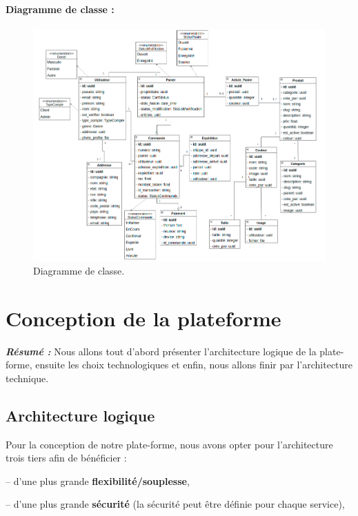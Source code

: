 \documentclass[a4paper, 12pt]{report}
\begin{document}
\subsubsection{Diagramme de classe :}
\begin{figure}[H]
    \centering
    \includegraphics[width = 1\linewidth]{img/samson_class_diagram.png}
    \caption{Diagramme de classe.}
\end{figure}
\chapter{Conception de la plateforme}
\textit{\textbf{Résumé : }}
Nous allons tout d’abord présenter l’architecture logique de la plate-forme, ensuite les choix technologiques et enfin, nous allons finir par l'architecture technique.
\setcounter{minitocdepth}{1}
\minitoc
\newpage
\section{Architecture logique}
Pour la conception de notre plate-forme, nous avons opter pour l'architecture trois tiers afin de bénéficier : 


-- d'une plus grande \textbf{flexibilité/souplesse},

-- d'une plus grande \textbf{sécurité} (la sécurité peut être définie pour chaque service),
\end{document}
